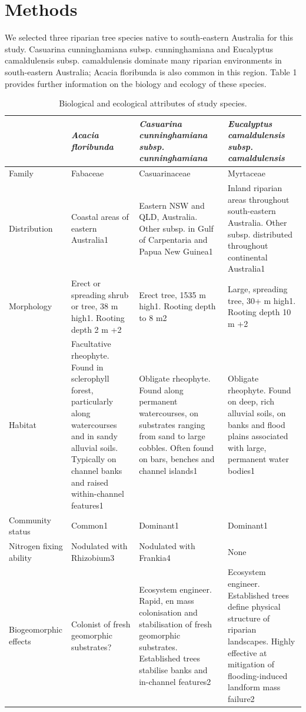 \documentclass[12pt,a4paper]{memoir}
\begin{document}
\section{Methods}
We selected three riparian tree species native to south-eastern Australia for this study. Casuarina cunninghamiana subsp. cunninghamiana and Eucalyptus camaldulensis subsp. camaldulensis dominate many riparian environments in south-eastern Australia; Acacia floribunda is also common in this region. Table 1 provides further information on the biology and ecology of these species.

\begin{table}[]
\tiny
\centering
\caption[Biological and ecological attributes of study species.]{\small{Biological and ecological attributes of study species.}}
\label{Ch5_T1}
\begin{tabular}{|p{3cm}|p{3cm}|p{3cm}|p{3cm}|}
\hline
 & {\textit{Acacia floribunda}} & {\textit{Casuarina cunninghamiana subsp. cunninghamiana}} & {\textit{Eucalyptus camaldulensis subsp. camaldulensis}} \\ \hline
Family & Fabaceae & Casuarinaceae & Myrtaceae \\ \hline
Distribution & Coastal areas of eastern Australia1 & Eastern NSW and QLD, Australia. Other subsp. in Gulf of Carpentaria and Papua New Guinea1 & Inland riparian areas throughout south-eastern Australia. Other subsp. distributed throughout continental Australia1 \\ \hline
Morphology & Erect or spreading shrub or tree, 38 m high1. Rooting depth 2 m +2 & Erect tree, 1535 m high1. Rooting depth to 8 m2 & Large, spreading tree, 30+ m high1. Rooting depth 10 m +2 \\ \hline
Habitat & Facultative rheophyte. Found in sclerophyll forest, particularly along watercourses and in sandy alluvial soils. Typically on channel banks and raised within-channel features1 & Obligate rheophyte. Found along permanent watercourses, on substrates ranging from sand to large cobbles. Often found on bars, benches and channel islands1 & Obligate rheophyte. Found on deep, rich alluvial soils, on banks and flood plains associated with large, permanent water bodies1 \\ \hline
Community status & Common1 & Dominant1 & Dominant1 \\ \hline
Nitrogen fixing ability & Nodulated with Rhizobium3 & Nodulated with Frankia4 & None \\ \hline
Biogeomorphic effects & Colonist of fresh geomorphic substrates? & Ecosystem engineer. Rapid, en mass colonisation and stabilisation of fresh geomorphic substrates. Established trees stabilise banks and in-channel features2 & Ecosystem engineer. Established trees define physical structure of riparian landscapes. Highly effective at mitigation of flooding-induced landform mass failure2 \\ \hline
\end{tabular}
\end{table}
\end{document}
